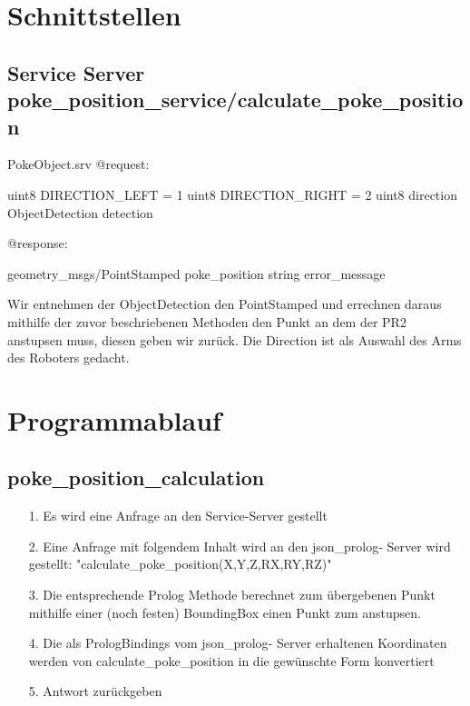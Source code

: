\documentclass{suturo}
\begin{document}
\section{Schnittstellen}

\subsection{Service Server poke\_position\_service/calculate\_poke\_position}
\begin{spverbatim}
PokeObject.srv
@request:

	uint8 DIRECTION_LEFT = 1
	uint8 DIRECTION_RIGHT = 2
	uint8 direction
	ObjectDetection detection

@response: 

	geometry_msgs/PointStamped poke_position
	string error_message
\end{spverbatim}
Wir entnehmen der ObjectDetection den PointStamped und errechnen daraus mithilfe der zuvor beschriebenen Methoden den Punkt an dem der PR2 anstupsen muss, diesen geben wir zurück. Die Direction ist als Auswahl des Arms des Roboters gedacht.

\section{Programmablauf}
\subsection{poke\_position\_calculation}
\begin{itemize}
\item[1.]Es wird eine Anfrage an den Service-Server gestellt
\item[2.]Eine Anfrage mit folgendem Inhalt wird an den json\_prolog- Server wird gestellt: "calculate\_poke\_position(X,Y,Z,RX,RY,RZ)" 
\item[3.]Die entsprechende Prolog Methode berechnet zum übergebenen Punkt mithilfe einer (noch festen) BoundingBox einen Punkt zum anstupsen.
\item[4.] Die als PrologBindings vom json\_prolog- Server erhaltenen Koordinaten werden von calculate\_poke\_position in die gewünschte Form konvertiert
\item[5.] Antwort zurückgeben
\end{itemize}
\end{document}
